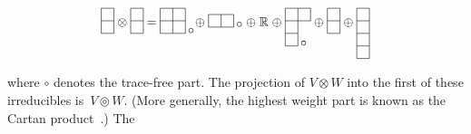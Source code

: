 \documentclass[a4paper,12pt]{amsart}
\newcommand{\topten}{\circledcirc}
\begin{document}
\begin{equation}\label{decompose}
\raisebox{-25pt}{$\begin{picture}(10,50)(0,-20)
\put(0,5){\line(1,0){10}}
\put(0,15){\line(1,0){10}}
\put(0,25){\line(1,0){10}}
\put(0,5){\line(0,1){20}}
\put(10,5){\line(0,1){20}}
\end{picture}
\raisebox{31pt}{$\;\otimes\;$}
\begin{picture}(10,50)(0,-20)
\put(0,5){\line(1,0){10}}
\put(0,15){\line(1,0){10}}
\put(0,25){\line(1,0){10}}
\put(0,5){\line(0,1){20}}
\put(10,5){\line(0,1){20}}
\end{picture}
\raisebox{31pt}{$\;=\;$}
\begin{picture}(25,50)(0,-20)
\put(0,5){\line(1,0){20}}
\put(0,15){\line(1,0){20}}
\put(0,25){\line(1,0){20}}
\put(0,5){\line(0,1){20}}
\put(10,5){\line(0,1){20}}
\put(20,5){\line(0,1){20}}
\put(22,7){\makebox(0,0)[l]{$\circ$}}
\end{picture}
\raisebox{31pt}{$\;\oplus\;$}
\begin{picture}(27,50)(0,-20)
\put(0,10){\line(1,0){20}}
\put(0,20){\line(1,0){20}}
\put(0,10){\line(0,1){10}}
\put(10,10){\line(0,1){10}}
\put(20,10){\line(0,1){10}}
\put(22,12){\makebox(0,0)[l]{$\circ$}}
\end{picture}
\raisebox{31pt}{$\;\oplus\;{\mathbb R}\;\oplus\;$}
\begin{picture}(20,50)
\put(0,15){\line(1,0){10}}
\put(0,25){\line(1,0){10}}
\put(0,35){\line(1,0){20}}
\put(0,45){\line(1,0){20}}
\put(0,15){\line(0,1){30}}
\put(10,15){\line(0,1){30}}
\put(20,35){\line(0,1){10}}
\put(12,17){\makebox(0,0)[l]{$\circ$}}
\end{picture}
\raisebox{31pt}{$\;\oplus\;$}
\begin{picture}(10,50)(0,-20)
\put(0,5){\line(1,0){10}}
\put(0,15){\line(1,0){10}}
\put(0,25){\line(1,0){10}}
\put(0,5){\line(0,1){20}}
\put(10,5){\line(0,1){20}}
\end{picture}
\raisebox{31pt}{$\;\oplus\;$}
\begin{picture}(10,50)
\put(0,5){\line(1,0){10}}
\put(0,15){\line(1,0){10}}
\put(0,25){\line(1,0){10}}
\put(0,35){\line(1,0){10}}
\put(0,45){\line(1,0){10}}
\put(0,5){\line(0,1){40}}
\put(10,5){\line(0,1){40}}
\end{picture}$}\end{equation}
where $\circ$ denotes the trace-free part. The projection of $V\otimes W$ into
the first of these irreducibles is~$V\topten W$. (More generally, the highest
weight part is known as the Cartan product~\cite[Supplement]{d}.) The
\end{document}
